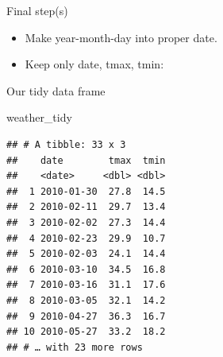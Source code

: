 \documentclass[ignorenonframetext,]{beamer}
\newenvironment{Shaded}{\begin{snugshade}}{\end{snugshade}}
\newcommand{\DataTypeTok}[1]{\textcolor[rgb]{0.13,0.29,0.53}{#1}}
\newcommand{\KeywordTok}[1]{\textcolor[rgb]{0.13,0.29,0.53}{\textbf{#1}}}
\newcommand{\NormalTok}[1]{#1}
\newcommand{\OperatorTok}[1]{\textcolor[rgb]{0.81,0.36,0.00}{\textbf{#1}}}
\newcommand{\StringTok}[1]{\textcolor[rgb]{0.31,0.60,0.02}{#1}}
\providecommand{\tightlist}{%
  \setlength{\itemsep}{0pt}\setlength{\parskip}{0pt}}
\begin{document}
\begin{frame}[fragile]{Final step(s)}
\protect\hypertarget{final-steps}{}

\begin{itemize}
\tightlist
\item
  Make year-month-day into proper date.
\item
  Keep only date, tmax, tmin:
\end{itemize}

\begin{Shaded}
\end{Shaded}

\end{frame}

\begin{frame}[fragile]{Our tidy data frame}
\protect\hypertarget{our-tidy-data-frame}{}

\begin{Shaded}
\begin{Highlighting}[]
\NormalTok{weather_tidy}
\end{Highlighting}
\end{Shaded}

\begin{verbatim}
## # A tibble: 33 x 3
##    date        tmax  tmin
##    <date>     <dbl> <dbl>
##  1 2010-01-30  27.8  14.5
##  2 2010-02-11  29.7  13.4
##  3 2010-02-02  27.3  14.4
##  4 2010-02-23  29.9  10.7
##  5 2010-02-03  24.1  14.4
##  6 2010-03-10  34.5  16.8
##  7 2010-03-16  31.1  17.6
##  8 2010-03-05  32.1  14.2
##  9 2010-04-27  36.3  16.7
## 10 2010-05-27  33.2  18.2
## # … with 23 more rows
\end{verbatim}

\end{frame}
\end{document}
